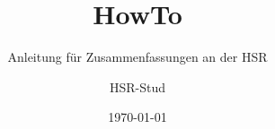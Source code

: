 \documentclass[
	titlepage=true %
]{scrartcl}
\title{HowTo}
\subtitle{Anleitung für Zusammenfassungen an der HSR}
\author{HSR-Stud}
\date{\today}
\begin{document}
\begin{titlepage}
	\thispagestyle{empty}
	\maketitle	
\end{titlepage}

\tableofcontents
\newpage





\end{document}
